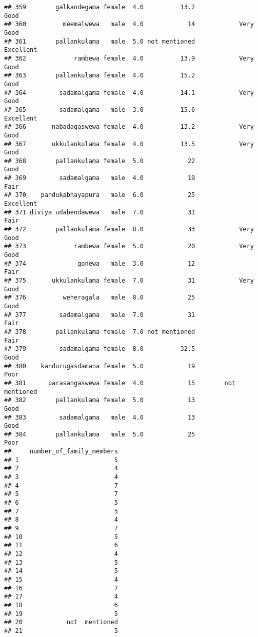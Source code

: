 \documentclass[
]{article}
\begin{document}
\begin{verbatim}
## 359        galkandegama female  4.0          13.2                 Good
## 360          meemalwewa   male  4.0            14            Very Good
## 361        pallankulama   male  5.0 not mentioned            Excellent
## 362             rambewa female  4.0          13.9            Very Good
## 363        pallankulama female  4.0          15.2                 Good
## 364         sadamalgama female  4.0          14.1            Very Good
## 365         sadamalgama   male  3.0          15.6            Excellent
## 366       nabadagaswewa female  4.0          13.2            Very Good
## 367       ukkulankulama female  4.0          13.5            Very Good
## 368        pallankulama female  5.0            22                 Good
## 369         sadamalgama   male  4.0            19                 Fair
## 370    pandukabhayapura   male  6.0            25            Excellent
## 371 diviya udabendawewa   male  7.0            31                 Fair
## 372        pallankulama female  8.0            33            Very Good
## 373             rambewa female  5.0            20            Very Good
## 374              gonewa   male  3.0            12                 Fair
## 375       ukkulankulama female  7.0            31            Very Good
## 376          weheragala   male  8.0            25                 Good
## 377         sadamalgama   male  7.0            31                 Fair
## 378        pallankulama female  7.0 not mentioned                 Fair
## 379         sadamalgama female  8.0          32.5                 Good
## 380    kandurugasdamana female  5.0            19                 Poor
## 381      parasangaswewa female  4.0            15        not mentioned
## 382        pallankulama female  5.0            13                 Good
## 383         sadamalgama   male  4.0            13                 Good
## 384        pallankulama   male  5.0            25                 Poor
##     number_of_family_members
## 1                          5
## 2                          4
## 3                          4
## 4                          7
## 5                          7
## 6                          5
## 7                          5
## 8                          4
## 9                          7
## 10                         5
## 11                         6
## 12                         4
## 13                         5
## 14                         5
## 15                         4
## 16                         7
## 17                         4
## 18                         6
## 19                         5
## 20            not  mentioned
## 21                         5

\end{verbatim}
\end{document}
